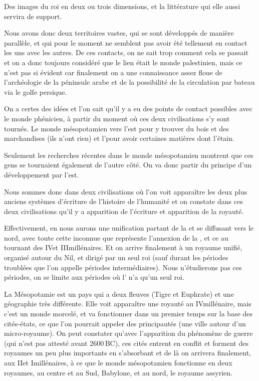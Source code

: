 \documentclass[a4paper]{article}
\begin{document}
Des  images du roi en deux ou trois dimensions, et la littérature qui
elle aussi servira de support.

Nous avons donc deux territoires vastes, qui se sont développés de 
manière parallèle, et qui pour le moment ne semblent pas avoir été 
tellement en contact les uns avec les autres. De ces contacts, on ne 
sait trop comment cela se passait et on a donc toujours considéré que 
le lien était le monde palestinien, mais ce n'est pas si évident car 
finalement on a une connaissance assez floue de l'archéologie de la 
péninsule arabe et de la possibilité de la circulation par bateau via 
le golfe persique.

On a certes des idées et l'on sait qu'il y a eu des points de contact 
possibles avec le monde phénicien, à partir du moment où ces deux 
civilisations s'y sont tournés. Le monde mésopotamien vers l'est pour 
y trouver du bois et des marchandises (ils n'ont rien) et l'\kmt pour 
avoir certaines matières dont l'étain.

Seulement les recherches récentes dans le monde mésopotamien montrent
que ces gens se tournaient également de l'autre côté. On va donc partir 
du principe d'un développement par l'est.

Nous sommes donc dans deux civilisations où l'on voit apparaître les 
deux plus anciens systèmes d'écriture de l'histoire de l'humanité et 
on constate dans ces deux civilisations  qu'il y a apparition de 
l'écriture et apparition de la royauté.

Effectivement, en \kmt nous aurons une unification partant de la 
\HE et se diffusant vers le nord, avec toute cette inconnue que 
représente l'annexion de la \BE, et ce au tournant des IV\ieme et 
III\ieme millénaires. Et on arrive finalement à un royaume unifié, 
organisé autour du Nil, et dirigé par un seul roi (sauf durant les 
périodes troublées que l'on appelle périodes intermédiaires). Nous 
n'étudierons pas ces périodes, on se limite aux périodes où l'\kmt 
n'a qu'un seul roi.

La Mésopotamie est un pays qui a deux fleuves (Tigre et Euphrate) et 
une géographie très différente. Elle voit apparaître une royauté au 
IV\ieme millénaire, mais c'est un monde morcelé, et va fonctionner 
dans un premier temps sur la base des cités-états, ce que l'on pourrait 
appeler des principautés (une ville autour d'un micro-royaume). On peut 
constater qu'avec l'apparition du phénomène de guerre (qui n'est pas 
attesté avant 2600\,BC), ces cités entrent en conflit et forment des 
royaumes un peu plus importants en s'absorbant et de là on arrivera 
finalement, aux II\ieme et I\ier millénaires, à ce que le monde 
mésopotamien fonctionne en deux royaumes, au centre et au Sud, Babylone, 
et au nord, le royaume assyrien.
\end{document}
